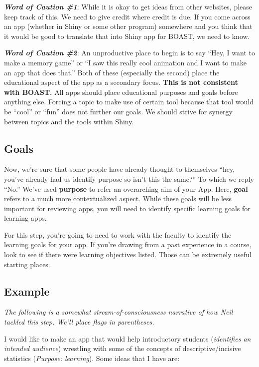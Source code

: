 \documentclass[
]{book}
\begin{document}
\emph{\textbf{Word of Caution \#1}}: While it is okay to get ideas from other websites, please keep track of this. We need to give credit where credit is due. If you come across an app (whether in Shiny or some other program) somewhere and you think that it would be good to translate that into Shiny app for BOAST, we need to know.

\emph{\textbf{Word of Caution \#2}}: An unproductive place to begin is to say ``Hey, I want to make a memory game'' or ``I saw this really cool animation and I want to make an app that does that.'' Both of these (especially the second) place the educational aspect of the app as a secondary focus. \textbf{This is not consistent with BOAST.} All apps should place educational purposes and goals before anything else. Forcing a topic to make use of certain tool because that tool would be ``cool'' or ``fun'' does not further our goals. We should strive for synergy between topics and the tools within Shiny.

\hypertarget{step2c}{%
\subsection{Goals}\label{step2c}}

Now, we're sure that some people have already thought to themselves ``hey, you've already had us identify purpose so isn't this the same?'' To which we reply ``No.'' We've used \textbf{purpose} to refer an overarching aim of your App. Here, \textbf{goal} refers to a much more contextualized aspect. While these goals will be less important for reviewing apps, you will need to identify specific learning goals for learning apps.

For this step, you're going to need to work with the faculty to identify the learning goals for your app. If you're drawing from a past experience in a course, look to see if there were learning objectives listed. Those can be extremely useful starting places.

\hypertarget{example}{%
\subsection{Example}\label{example}}

\emph{The following is a somewhat stream-of-consciousness narrative of how Neil tackled this step. We'll place flags in parentheses.}

I would like to make an app that would help introductory students (\emph{identifies an intended audience}) wrestling with some of the concepts of descriptive/incisive statistics (\emph{Purpose: learning}). Some ideas that I have are:
\end{document}
